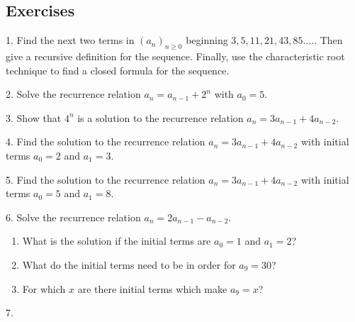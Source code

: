 \documentclass[10pt,]{book}
\theoremstyle{plain}
\theoremstyle{definition}
\theoremstyle{definition}
\theoremstyle{definition}
\theoremstyle{definition}
\numberwithin{equation}{chapter}
\begin{document}
\subsection[{Exercises}]{Exercises}\label{exercises-sec-recurrence}
\begin{exerciselist}
\item[1.]\hypertarget{exercise-33}{}\hypertarget{p-342}{}%
Find the next two terms in \((a_n)_{n\ge 0}\) beginning \(3, 5, 11, 21, 43, 85\ldots.\). Then give a recursive definition for the sequence. Finally, use the characteristic root technique to find a closed formula for the sequence.%
\par\smallskip
\item[2.]\hypertarget{exercise-34}{}\hypertarget{p-344}{}%
Solve the recurrence relation \(a_n = a_{n-1} + 2^n\) with \(a_0 = 5\).%
\par\smallskip
\item[3.]\hypertarget{exercise-35}{}\hypertarget{p-346}{}%
Show that \(4^n\) is a solution to the recurrence relation \(a_n = 3a_{n-1} + 4a_{n-2}\).%
\par\smallskip
\item[4.]\hypertarget{exercise-36}{}\hypertarget{p-348}{}%
Find the solution to the recurrence relation \(a_n = 3a_{n-1} + 4a_{n-2}\) with initial terms \(a_0 = 2\) and \(a_1 = 3\).%
\par\smallskip
\item[5.]\hypertarget{exercise-37}{}\hypertarget{p-350}{}%
Find the solution to the recurrence relation \(a_n = 3a_{n-1} + 4a_{n-2}\) with initial terms \(a_0 = 5\) and \(a_1 = 8\).%
\par\smallskip
\item[6.]\hypertarget{exercise-38}{}\hypertarget{p-351}{}%
Solve the recurrence relation \(a_n = 2a_{n-1} - a_{n-2}\).%
\leavevmode%
\begin{enumerate}[label=(\alph*)]
\item\hypertarget{li-184}{}\hypertarget{p-352}{}%
What is the solution if the initial terms are \(a_0 = 1\) and \(a_1 = 2\)?%
\item\hypertarget{li-185}{}\hypertarget{p-353}{}%
What do the initial terms need to be in order for \(a_9 = 30\)?%
\item\hypertarget{li-186}{}\hypertarget{p-354}{}%
For which \(x\) are there initial terms which make \(a_9 = x\)?%
\end{enumerate}
\par\smallskip
\item[7.]\hypertarget{exercise-39}{}\hypertarget{p-355}{}%

\end{exerciselist}
\end{document}
